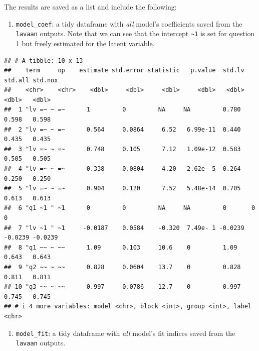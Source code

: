 \documentclass[
  man]{apa6}
\newenvironment{Shaded}{\begin{snugshade}}{\end{snugshade}}
\newcommand{\DecValTok}[1]{\textcolor[rgb]{0.00,0.00,0.81}{#1}}
\newcommand{\NormalTok}[1]{#1}
\newcommand{\SpecialCharTok}[1]{\textcolor[rgb]{0.00,0.00,0.00}{#1}}
\providecommand{\tightlist}{%
  \setlength{\itemsep}{0pt}\setlength{\parskip}{0pt}}
\begin{document}
The results are saved as a list and include the following:

\begin{enumerate}
\def\labelenumi{\arabic{enumi})}
\tightlist
\item
  \texttt{model\_coef}: a tidy dataframe with \emph{all} model's coefficients saved from the \texttt{lavaan} outputs. Note that we can see that the intercept \texttt{\textasciitilde{}1} is set for question 1 but freely estimated for the latent variable.
\end{enumerate}

\small

\begin{Shaded}
\end{Shaded}

\normalsize

\begin{verbatim}
## # A tibble: 10 x 13
##    term     op    estimate std.error statistic   p.value  std.lv std.all std.nox
##    <chr>    <chr>    <dbl>     <dbl>     <dbl>     <dbl>   <dbl>   <dbl>   <dbl>
##  1 "lv =~ ~ =~      1         0         NA     NA         0.780   0.598   0.598 
##  2 "lv =~ ~ =~      0.564     0.0864     6.52   6.99e-11  0.440   0.435   0.435 
##  3 "lv =~ ~ =~      0.748     0.105      7.12   1.09e-12  0.583   0.505   0.505 
##  4 "lv =~ ~ =~      0.338     0.0804     4.20   2.62e- 5  0.264   0.250   0.250 
##  5 "lv =~ ~ =~      0.904     0.120      7.52   5.48e-14  0.705   0.613   0.613 
##  6 "q1 ~1 " ~1      0         0         NA     NA         0       0       0     
##  7 "lv ~1 " ~1     -0.0187    0.0584    -0.320  7.49e- 1 -0.0239 -0.0239 -0.0239
##  8 "q1 ~~ ~ ~~      1.09      0.103     10.6    0         1.09    0.643   0.643 
##  9 "q2 ~~ ~ ~~      0.828     0.0604    13.7    0         0.828   0.811   0.811 
## 10 "q3 ~~ ~ ~~      0.997     0.0786    12.7    0         0.997   0.745   0.745 
## # i 4 more variables: model <chr>, block <int>, group <int>, label <chr>
\end{verbatim}

\begin{enumerate}
\def\labelenumi{\arabic{enumi})}
\setcounter{enumi}{1}
\tightlist
\item
  \texttt{model\_fit}: a tidy dataframe with \emph{all} model's fit indices saved from the \texttt{lavaan} outputs.
\end{enumerate}
\end{document}
